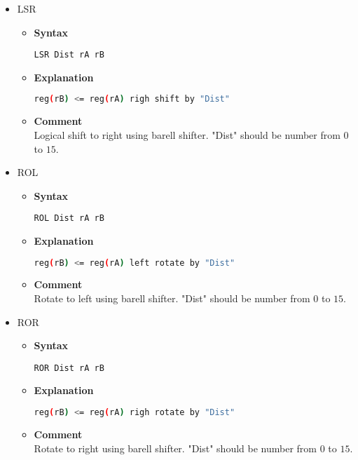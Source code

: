 \begin{itemize}
    \item LSR
    \begin{itemize}
        \item \textbf{Syntax}
        \begin{lstlisting}[language={[x86masm]Assembler}, frame=single]
    LSR Dist rA rB
        \end{lstlisting}
        \item \textbf{Explanation}
        \begin{lstlisting}[language=bash, frame=single]
    reg(rB) <= reg(rA) righ shift by "Dist"
        \end{lstlisting}
        \item \textbf{Comment} \\
    Logical shift to right using barell shifter. "Dist" should be number from $0$ to $15$.
    \end{itemize}

    \item ROL
    \begin{itemize}
        \item \textbf{Syntax}
        \begin{lstlisting}[language={[x86masm]Assembler}, frame=single]
    ROL Dist rA rB
        \end{lstlisting}
        \item \textbf{Explanation}
        \begin{lstlisting}[language=bash, frame=single]
    reg(rB) <= reg(rA) left rotate by "Dist"
        \end{lstlisting}
        \item \textbf{Comment} \\
    Rotate to left using barell shifter. "Dist" should be number from $0$ to $15$.
    \end{itemize}

    \item ROR
    \begin{itemize}
        \item \textbf{Syntax}
        \begin{lstlisting}[language={[x86masm]Assembler}, frame=single]
    ROR Dist rA rB
        \end{lstlisting}
        \item \textbf{Explanation}
        \begin{lstlisting}[language=bash, frame=single]
    reg(rB) <= reg(rA) righ rotate by "Dist"
        \end{lstlisting}
        \item \textbf{Comment} \\
    Rotate to right using barell shifter. "Dist" should be number from $0$ to $15$.
    \end{itemize}


\end{itemize}

